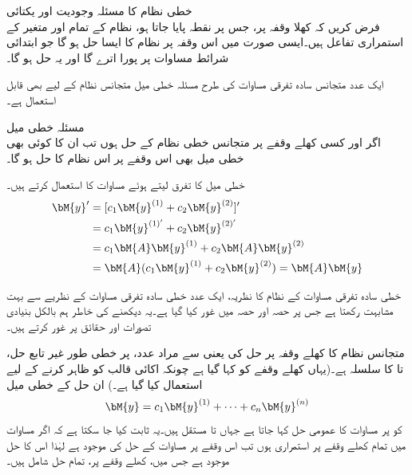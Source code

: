 \quad خطی نظام کا مسئلہ وجودیت اور یکتائی \\
فرض کریں کہ کھلا وقفہ  پر، جس پر نقطہ  پایا جاتا ہو،  نظام  کے تمام  اور  متغیر  کے استمراری  تفاعل ہیں۔ایسی صورت میں اس وقفہ پر نظام  کا ایسا حل   ہو گا جو ابتدائی شرائط مساوات  پر پورا اترے گا  اور  یہ حل  ہو گا۔

ایک عدد متجانس سادہ تفرقی مساوات کی طرح  مسئلہ خطی میل متجانس نظام کے لیے بھی قابل استعمال ہے۔ 

\quad مسئلہ خطی میل\\
اگر  اور  کسی کھلے وقفے پر متجانس خطی نظام  کے حل ہوں تب ان کا کوئی بھی خطی میل   بھی اس وقفے پر  اس نظام کا حل ہو گا۔ 

خطی میل    کا تفرق لیتے ہوئے مساوات  کا استعمال کرتے ہیں۔
\begin{align*}
\bM{y}'&=[c_1\bM{y}^{(1)}+c_2\bM{y}^{(2)}]'\\
&=c_1\bM{y}^{(1)'}+c_2\bM{y}^{(2)'}\\
&=c_1\bM{A}\bM{y}^{(1)}+c_2\bM{A}\bM{y}^{(2)}\\
&=\bM{A}(c_1\bM{y}^{(1)}+c_2\bM{y}^{(2)})=\bM{A}\bM{y}
\end{align*}

خطی سادہ تفرقی مساوات کے نظام کا نظریہ، ایک عدد خطی سادہ تفرقی مساوات کے نظریے سے بہت مشابہت رکھتا ہے جس پر حصہ  اور حصہ  میں غور کیا گیا ہے۔یہ دیکھنے کی خاطر ہم بالکل بنیادی تصورات اور حقائق پر غور کرتے ہیں۔ 

متجانس نظام  کا کھلے وقفہ  پر حل کی  یعنی  سے مراد  عدد،  پر خطی طور غیر تابع حل،  تا  کا سلسلہ ہے۔(یہاں کھلے وقفے کو  کہا گیا ہے چونکہ  اکائی قالب کو ظاہر کرنے کے لیے استعمال کیا گیا ہے۔) ان حل کے خطی میل
\begin{align}\label{مساوات_نظام_ورونسکی_الف}
\bM{y}=c_1\bM{y}^{(1)}+\cdots+c_n\bM{y}^{(n)}
\end{align}
کو  پر مساوات  کا عمومی حل کہا جاتا ہے جہاں  تا   مستقل ہیں۔یہ ثابت کیا جا سکتا ہے کہ اگر مساوات  میں تمام  کھلے وقفے پر استمراری ہوں تب اس وقفے پر مساوات  کے حل کی  موجود ہے لہٰذا اس کا  حل موجود ہے جس میں، کھلے وقفے پر، تمام حل شامل ہیں۔

